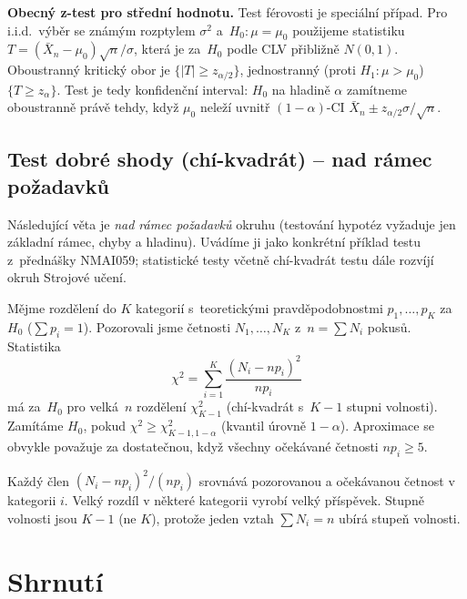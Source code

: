 \documentclass[11pt,a4paper]{article}
\begin{document}
\begin{poznamka}
\textbf{Obecný z-test pro střední hodnotu.} Test férovosti je speciální případ. Pro i.i.d.\ výběr se známým rozptylem $\sigma^2$ a~$H_0\colon\mu=\mu_0$ použijeme statistiku $T=(\bar X_n-\mu_0)\sqrt n/\sigma$, která je za~$H_0$ podle CLV přibližně $N(0,1)$. Oboustranný kritický obor je $\{|T|\ge z_{\alpha/2}\}$, jednostranný (proti $H_1\colon\mu>\mu_0$) $\{T\ge z_{\alpha}\}$. Test je tedy  konfidenční interval: $H_0$ na hladině $\alpha$ zamítneme oboustranně právě tehdy, když $\mu_0$ neleží uvnitř $(1-\alpha)$-CI $\bar X_n\pm z_{\alpha/2}\sigma/\sqrt n$.
\end{poznamka}

\subsection{Test dobré shody (chí-kvadrát) -- nad rámec požadavků}

\begin{poznamka}
Následující věta je \emph{nad rámec požadavků} okruhu (testování hypotéz vyžaduje jen základní rámec, chyby a hladinu). Uvádíme ji jako konkrétní příklad testu z~přednášky NMAI059; statistické testy včetně chí-kvadrát testu dále rozvíjí okruh Strojové učení.
\end{poznamka}

\begin{veta}
Mějme rozdělení do $K$ kategorií s~teoretickými pravděpodobnostmi $p_1,\dots,p_K$ za~$H_0$ ($\sum p_i=1$). Pozorovali jsme četnosti $N_1,\dots,N_K$ z~$n=\sum N_i$ pokusů. Statistika
\[
\chi^2=\sum_{i=1}^K\frac{(N_i-np_i)^2}{np_i}
\]
má za~$H_0$ pro velká~$n$ rozdělení $\chi^2_{K-1}$ (chí-kvadrát s~$K-1$ stupni volnosti). Zamítáme $H_0$, pokud $\chi^2\ge\chi^2_{K-1,1-\alpha}$ (kvantil úrovně $1-\alpha$). Aproximace se obvykle považuje za dostatečnou, když všechny očekávané četnosti $np_i\ge 5$.
\end{veta}

\begin{intuice}
Každý člen $(N_i-np_i)^2/(np_i)$ srovnává pozorovanou a očekávanou četnost v kategorii $i$. Velký rozdíl v některé kategorii vyrobí velký příspěvek. Stupně volnosti jsou $K-1$ (ne $K$), protože jeden vztah $\sum N_i=n$ ubírá stupeň volnosti.
\end{intuice}

\section*{Shrnutí}
\end{document}
